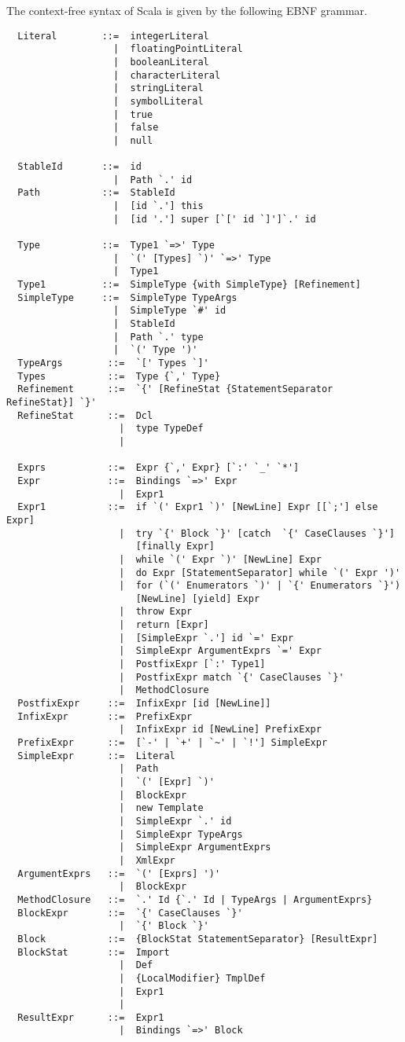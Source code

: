 The context-free syntax of Scala is given by the following EBNF
grammar.

\begin{lstlisting}
  Literal        ::=  integerLiteral
                   |  floatingPointLiteral
                   |  booleanLiteral
                   |  characterLiteral
                   |  stringLiteral
                   |  symbolLiteral
                   |  true
                   |  false
                   |  null

  StableId       ::=  id
                   |  Path `.' id
  Path           ::=  StableId
                   |  [id `.'] this
                   |  [id '.'] super [`[' id `]']`.' id

  Type           ::=  Type1 `=>' Type
                   |  `(' [Types] `)' `=>' Type
                   |  Type1
  Type1          ::=  SimpleType {with SimpleType} [Refinement]
  SimpleType     ::=  SimpleType TypeArgs
                   |  SimpleType `#' id
                   |  StableId
                   |  Path `.' type
                   |  `(' Type ')'
  TypeArgs        ::=  `[' Types `]'
  Types           ::=  Type {`,' Type}
  Refinement      ::=  `{' [RefineStat {StatementSeparator RefineStat}] `}'
  RefineStat      ::=  Dcl
                    |  type TypeDef
                    |

  Exprs           ::=  Expr {`,' Expr} [`:' `_' `*']
  Expr            ::=  Bindings `=>' Expr
                    |  Expr1
  Expr1           ::=  if `(' Expr1 `)' [NewLine] Expr [[`;'] else Expr]
                    |  try `{' Block `}' [catch  `{' CaseClauses `}'] 
                       [finally Expr]
                    |  while `(' Expr `)' [NewLine] Expr
                    |  do Expr [StatementSeparator] while `(' Expr ')'
                    |  for (`(' Enumerators `)' | `{' Enumerators `}') 
                       [NewLine] [yield] Expr
                    |  throw Expr
                    |  return [Expr]
                    |  [SimpleExpr `.'] id `=' Expr
                    |  SimpleExpr ArgumentExprs `=' Expr
                    |  PostfixExpr [`:' Type1]
                    |  PostfixExpr match `{' CaseClauses `}'
                    |  MethodClosure
  PostfixExpr     ::=  InfixExpr [id [NewLine]]
  InfixExpr       ::=  PrefixExpr
                    |  InfixExpr id [NewLine] PrefixExpr
  PrefixExpr      ::=  [`-' | `+' | `~' | `!'] SimpleExpr 
  SimpleExpr      ::=  Literal
                    |  Path
                    |  `(' [Expr] `)'
                    |  BlockExpr
                    |  new Template 
                    |  SimpleExpr `.' id 
                    |  SimpleExpr TypeArgs
                    |  SimpleExpr ArgumentExprs
                    |  XmlExpr
  ArgumentExprs   ::=  `(' [Exprs] ')'
                    |  BlockExpr
  MethodClosure   ::=  `.' Id {`.' Id | TypeArgs | ArgumentExprs}
  BlockExpr       ::=  `{' CaseClauses `}'
                    |  `{' Block `}'
  Block           ::=  {BlockStat StatementSeparator} [ResultExpr]
  BlockStat       ::=  Import
                    |  Def
                    |  {LocalModifier} TmplDef
                    |  Expr1
                    |
  ResultExpr      ::=  Expr1
                    |  Bindings `=>' Block


\end{lstlisting}
